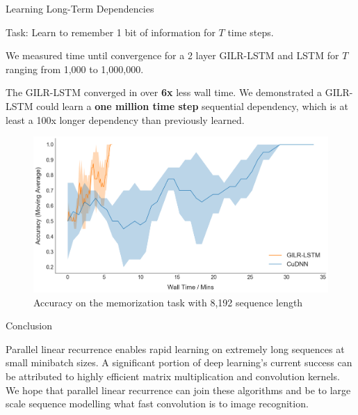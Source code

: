 \documentclass[final]{beamer}
\newlength{\onecolwid}
\begin{document}
\begin{frame}[t]
\begin{columns}[t]
\begin{column}{\onecolwid} %

\begin{block}{Learning Long-Term Dependencies}

Task: Learn to remember 1 bit of information for $T$ time steps.

\vspace{1ex}
We measured time until convergence for a 2 layer GILR-LSTM and LSTM for $T$ ranging from
1,000 to 1,000,000.

\vspace{1ex}
The GILR-LSTM converged in over \textbf{6x} less wall time. We demonstrated a
GILR-LSTM could learn a \textbf{one million time step} sequential dependency, which
is at least a 100x longer dependency than previously learned.

\vspace{2ex}
\begin{figure}
\includegraphics[width=1.0\linewidth]{8k_for_poster.png}
\caption{Accuracy on the memorization task with 8,192 sequence length}
\end{figure}

\end{block}



\begin{block}{Conclusion}

Parallel linear recurrence enables rapid learning on extremely long sequences at small
minibatch sizes. A significant portion of deep learning's current success can be
attributed to highly efficient matrix multiplication and convolution kernels.
We hope that parallel linear recurrence can join these algorithms and
be to large scale sequence
modelling what fast convolution is to image recognition.


\end{block}
\end{column}
\end{columns}
\end{frame}
\end{document}
